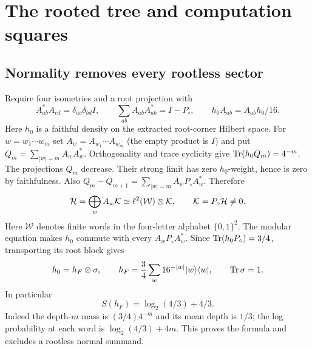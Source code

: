 \section{The rooted tree and computation squares}\label{sec:tree}
\subsection{Normality removes every rootless sector}
Require four isometries and a root projection with
\begin{equation}\label{eq:fockrelations}
 A_{ab}^*A_{cd}=\delta_{ac}\delta_{bd}I,\qquad
 \sum_{ab}A_{ab}A_{ab}^*=I-P_{\circ},\qquad h_0A_{ab}=A_{ab}h_0/16.
\end{equation}
Here $h_0$ is a faithful density on the extracted root-corner Hilbert space. For $w=w_1\cdots w_m$ set $A_w=A_{w_1}\cdots A_{w_m}$ (the empty product is $I$) and put $Q_m=\sum_{|w|=m}A_wA_w^*$. Orthogonality and trace cyclicity give $\operatorname{Tr}(h_0Q_m)=4^{-m}$. The projections $Q_m$ decrease. Their strong limit has zero $h_0$-weight, hence is zero by faithfulness. Also $Q_m-Q_{m+1}=\sum_{|w|=m}A_wP_{\circ}A_w^*$. Therefore
\begin{equation}\label{eq:fockdecomp}
 \mathcal H=\bigoplus_w A_w\mathcal K\simeq\ell^2(\mathcal W)\otimes\mathcal K,
 \qquad \mathcal K=P_{\circ}\mathcal H\ne0.
\end{equation}
Here $\mathcal W$ denotes finite words in the four-letter alphabet $\{0,1\}^2$. The modular equation makes $h_0$ commute with every $A_wP_{\circ}A_w^*$. Since $\operatorname{Tr}(h_0P_{\circ})=3/4$, transporting its root block gives
\begin{equation}\label{eq:fockdensity}
 h_0=h_F\otimes\sigma,\qquad
 h_F=\frac34\sum_w16^{-|w|}|w\rangle\langle w|,
 \qquad \operatorname{Tr}\sigma=1.
\end{equation}
In particular
\begin{equation}\label{eq:fockentropy}
 S(h_F)=\log_2(4/3)+4/3.
\end{equation}
Indeed the depth-$m$ mass is $(3/4)4^{-m}$ and its mean depth is $1/3$; the log probability at each word is $\log_2(4/3)+4m$. This proves the formula and excludes a rootless normal summand.

